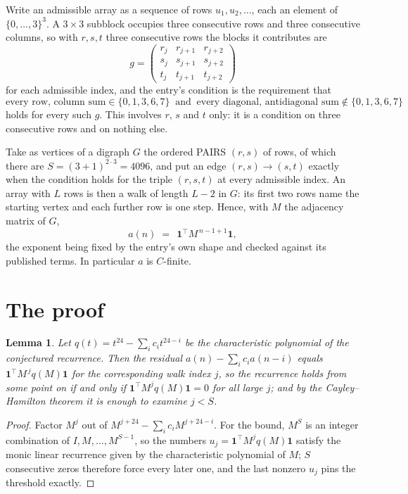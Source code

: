 \documentclass[11pt,a4paper]{article}
\theoremstyle{plain}
\newtheorem{lemma}[theorem]{Lemma}
\theoremstyle{definition}
\begin{document}
Write an admissible array as a sequence of rows $u_1,u_2,\dots$, each an element of
$\{0,\dots,3\}^{3}$. A $3\times3$ subblock occupies three consecutive rows and
three consecutive columns, so with $r,s,t$ three consecutive rows the blocks it
contributes are
\[
g=\begin{pmatrix}r_j&r_{j+1}&r_{j+2}\\ s_j&s_{j+1}&s_{j+2}\\ t_j&t_{j+1}&t_{j+2}\end{pmatrix}
\]
for each admissible index, and the entry's condition is the requirement that
\[
\text{every row, column sum} \in \{0,1,3,6,7\}\ \text{ and }\ \text{every diagonal, antidiagonal sum} \notin \{0,1,3,6,7\}
\]
holds for every such $g$. This involves $r$, $s$ and $t$ only: it is a condition on
three consecutive rows and on nothing else.

Take as vertices of a digraph $G$ the ordered PAIRS $(r,s)$ of rows, of which there are
$S=(3+1)^{2\cdot3}=4096$, and put an edge $(r,s)\to(s,t)$ exactly when the condition
holds for the triple $(r,s,t)$ at every admissible index. An array with $L$ rows is then a
walk of length $L-2$ in $G$: its first two rows name the starting vertex and each further
row is one step. Hence, with $M$ the adjacency matrix of $G$,
\[
a(n)\;=\;\,\mathbf{1}^{\!\top}M^{\,n-1+1}\mathbf{1},
\]
the exponent being fixed by the entry's own shape and checked against its published terms.
In particular $a$ is $C$-finite.

\section{The proof}

\begin{lemma}\label{lem:crit}
Let $q(t)=t^{24}-\sum_i c_it^{24-i}$ be the characteristic polynomial of the
conjectured recurrence. Then the residual $a(n)-\sum_ic_ia(n-i)$ equals
$\mathbf{1}^{\!\top}M^{\,j}q(M)\mathbf{1}$ for the corresponding walk index
$j$, so the recurrence holds from some point on if and only if
$\mathbf{1}^{\!\top}M^{j}q(M)\mathbf{1}=0$ for all large $j$; and by the
Cayley--Hamilton theorem it is enough to examine $j<S$.
\end{lemma}

\begin{proof}
Factor $M^{j}$ out of $M^{j+24}-\sum_ic_iM^{j+24-i}$. For the bound, $M^{S}$
is an integer combination of $I,M,\dots,M^{S-1}$, so the numbers
$u_j=\mathbf{1}^{\!\top}M^{j}q(M)\mathbf{1}$ satisfy the monic linear recurrence given by
the characteristic polynomial of $M$; $S$ consecutive zeros therefore force every later one,
and the last nonzero $u_j$ pins the threshold exactly.
\end{proof}
\end{document}
